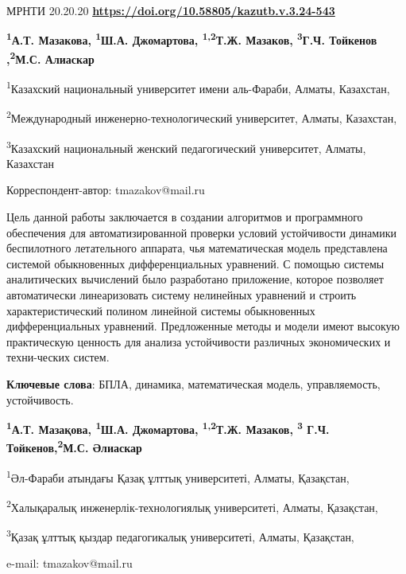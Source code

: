 \newpage
МРНТИ 20.20.20
\hfill {\bfseries \href{https://doi.org/10.58805/kazutb.v.3.24-543}{https://doi.org/10.58805/kazutb.v.3.24-543}}


\begin{center}
{\bfseries \textsuperscript{1}А.Т. Мазакова,
\textsuperscript{1}Ш.А. Джомартова, \textsuperscript{1,2}Т.Ж.
Мазаков\envelope, \textsuperscript{3}Г.Ч. Тойкенов ,\textsuperscript{2}М.С. Алиаскар}

\textsuperscript{1}Казахский национальный университет имени аль-Фараби,
Алматы, Казахстан,

\textsuperscript{2}Международный инженерно-технологический университет,
Алматы, Казахстан,

\textsuperscript{3}Казахский национальный женский педагогический
университет, Алматы, Казахстан
\end{center}
\envelope Корреспондент-автор: tmazakov@mail.ru \vspace{0.5cm}

Цель данной работы заключается в создании алгоритмов и программного
обеспечения для автоматизированной проверки условий устойчивости
динамики беспилотного летательного аппарата, чья математическая модель
представлена системой обыкновенных дифференциальных уравнений. С помощью
системы аналитических вычислений было разработано приложение, которое
позволяет автоматически линеаризовать систему нелинейных уравнений и
строить характеристический полином линейной системы обыкновенных
дифференциальных уравнений. Предложенные методы и модели имеют высокую
практическую ценность для анализа устойчивости различных экономических и
техни-ческих систем.

{\bfseries Ключевые слова}: БПЛА, динамика, математическая модель,
управляемость, устойчивость.


\begin{center}
{\bfseries \textsuperscript{1}А.Т. Мазақова,
\textsuperscript{1}Ш.А. Джомартова, \textsuperscript{1,2}Т.Ж.
Мазаков\envelope, \textsuperscript{3} Г.Ч. Тойкенов,\textsuperscript{2}М.С. Әлиаскар}

\textsuperscript{1}Әл-Фараби атындағы Қазақ ұлттық университеті, Алматы,
Қазақстан,

\textsuperscript{2}Халықаралық инженерлік-технологиялық университеті,
Алматы, Қазақстан,

\textsuperscript{3}Қазақ ұлттық қыздар педагогикалық университеті,
Алматы, Қазақстан,

e-mail: tmazakov@mail.ru
\end{center}

